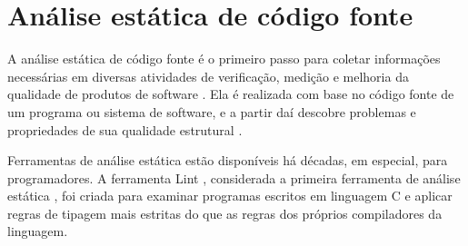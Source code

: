 
\section{Análise estática de código fonte} \label{analise-estatica}

A análise estática de código fonte é o primeiro passo para coletar informações
necessárias em diversas atividades de verificação, medição e melhoria da
qualidade de produtos de software \cite{Cruz2009, Kirkov2010}. Ela é
realizada com base no código fonte de um programa ou sistema de software, e a
partir daí descobre problemas e propriedades de sua qualidade estrutural
\cite{Chess2007}.

Ferramentas de análise estática estão disponíveis há décadas, em especial,
para programadores. A ferramenta Lint \cite{Johnson1978}, considerada a
primeira ferramenta de análise estática \cite{Gosain2015}, foi criada para
examinar programas escritos em linguagem C e aplicar regras de tipagem mais
estritas do que as regras dos próprios compiladores da linguagem.

%

